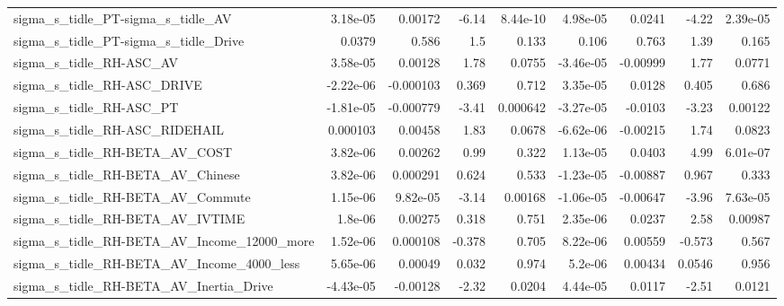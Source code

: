 \begin{tabular}{lrrrrrrrr}
sigma\_s\_tidle\_PT-sigma\_s\_tidle\_AV                  &    3.18e-05 &      0.00172 &    -6.14 & 8.44e-10 &   4.98e-05 &      0.0241 &        -4.22 &      2.39e-05 \\
sigma\_s\_tidle\_PT-sigma\_s\_tidle\_Drive               &      0.0379 &        0.586 &      1.5 &    0.133 &      0.106 &       0.763 &         1.39 &         0.165 \\
sigma\_s\_tidle\_RH-ASC\_AV                            &    3.58e-05 &      0.00128 &     1.78 &   0.0755 &  -3.46e-05 &    -0.00999 &         1.77 &        0.0771 \\
sigma\_s\_tidle\_RH-ASC\_DRIVE                         &   -2.22e-06 &    -0.000103 &    0.369 &    0.712 &   3.35e-05 &      0.0128 &        0.405 &         0.686 \\
sigma\_s\_tidle\_RH-ASC\_PT                            &   -1.81e-05 &    -0.000779 &    -3.41 & 0.000642 &  -3.27e-05 &     -0.0103 &        -3.23 &       0.00122 \\
sigma\_s\_tidle\_RH-ASC\_RIDEHAIL                      &    0.000103 &      0.00458 &     1.83 &   0.0678 &  -6.62e-06 &    -0.00215 &         1.74 &        0.0823 \\
sigma\_s\_tidle\_RH-BETA\_AV\_COST                      &    3.82e-06 &      0.00262 &     0.99 &    0.322 &   1.13e-05 &      0.0403 &         4.99 &      6.01e-07 \\
sigma\_s\_tidle\_RH-BETA\_AV\_Chinese                   &    3.82e-06 &     0.000291 &    0.624 &    0.533 &  -1.23e-05 &    -0.00887 &        0.967 &         0.333 \\
sigma\_s\_tidle\_RH-BETA\_AV\_Commute                   &    1.15e-06 &     9.82e-05 &    -3.14 &  0.00168 &  -1.06e-05 &    -0.00647 &        -3.96 &      7.63e-05 \\
sigma\_s\_tidle\_RH-BETA\_AV\_IVTIME                    &     1.8e-06 &      0.00275 &    0.318 &    0.751 &   2.35e-06 &      0.0237 &         2.58 &       0.00987 \\
sigma\_s\_tidle\_RH-BETA\_AV\_Income\_12000\_more         &    1.52e-06 &     0.000108 &   -0.378 &    0.705 &   8.22e-06 &     0.00559 &       -0.573 &         0.567 \\
sigma\_s\_tidle\_RH-BETA\_AV\_Income\_4000\_less          &    5.65e-06 &      0.00049 &    0.032 &    0.974 &    5.2e-06 &     0.00434 &       0.0546 &         0.956 \\
sigma\_s\_tidle\_RH-BETA\_AV\_Inertia\_Drive             &   -4.43e-05 &     -0.00128 &    -2.32 &   0.0204 &   4.44e-05 &      0.0117 &        -2.51 &        0.0121 \\

\end{tabular}
